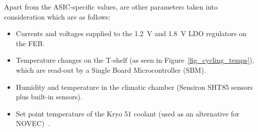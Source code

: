 \newpage
Apart from the \gls{ASIC}-specific values, are other parameters taken into consideration which are as
follows:
\begin{itemize}
    \item Currents and voltages supplied to the \SI{1.2}{\volt} and \SI{1.8}{\volt} \gls{LDO} regulators on the \gls{FEB}.
    \item Temperature changes on the T-shelf (as seen in Figure~\ref{fig_cycling_temps}), which are read-out by a Single Board Microcontroller (\gls{SBM}).
    \item Humidity and temperature in the climatic chamber (Sensiron SHT85 sensors plus built-in sensors).
    \item Set point temperature of the Kryo 51 coolant (used as an alternative for NOVEC)~\cite{KRYO}.
\end{itemize}

